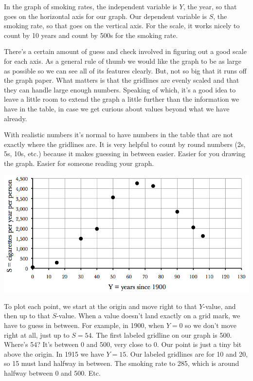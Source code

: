 In the graph of smoking rates, the independent variable is $Y$, the year, so that goes on the horizontal axis for our graph.  Our dependent variable is $S$, the smoking rate, so that goes on the vertical axis.  For the scale, it works nicely to count by 10 years and count by 500s for the smoking rate. 

There's a certain amount of guess and check involved in figuring out a good scale for each axis.  As a general rule of thumb we would like the graph to be as large as possible so we can see all of its features clearly.  But, not so big that it runs off the graph paper.  What matters is that the gridlines are evenly scaled and that they can handle large enough numbers.  Speaking of which, it's a good idea to leave a little room to extend the graph a little further than the information we have in the table, in case we get curious about values beyond what we have already. 

With realistic numbers it's normal to have numbers in the table that are not exactly where the gridlines are. It is very helpful to count by round numbers (2s, 5s, 10s, etc.) because it makes guessing in between easier.  Easier for you drawing the graph.  Easier for someone reading your graph.  

\begin{center}
 {\includegraphics [width = 6in] {CigScatter3.png}}
\end{center}

To plot each point, we start at the origin and move right to that $Y$-value, and then up to that $S$-value.  When a value doesn't land exactly on a grid mark, we have to guess in between.  For example, in 1900, when $Y=0$ so we don't move right at all, just up to $S=54$.  The first labeled gridline on our graph is 500.  Where's 54?  It's  between 0 and 500, very close to 0.  Our point is just a tiny bit above the origin.  In 1915 we have $Y=15$. Our labeled gridlines are for 10 and 20, so 15 must land halfway in between.  The smoking rate to 285, which is around halfway between 0 and 500.  Etc.

